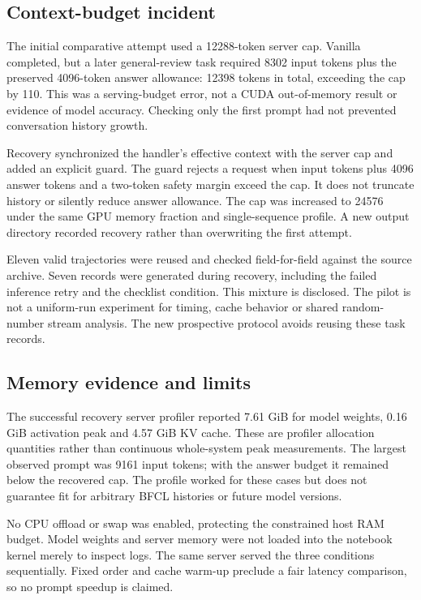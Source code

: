 \documentclass[conference]{IEEEtran}
\begin{document}
\subsection{Context-budget incident}
The initial comparative attempt used a 12288-token server cap. Vanilla completed, but a later general-review task required 8302 input tokens plus the preserved 4096-token answer allowance: 12398 tokens in total, exceeding the cap by 110. This was a serving-budget error, not a CUDA out-of-memory result or evidence of model accuracy. Checking only the first prompt had not prevented conversation history growth.

Recovery synchronized the handler's effective context with the server cap and added an explicit guard. The guard rejects a request when input tokens plus 4096 answer tokens and a two-token safety margin exceed the cap. It does not truncate history or silently reduce answer allowance. The cap was increased to 24576 under the same GPU memory fraction and single-sequence profile. A new output directory recorded recovery rather than overwriting the first attempt.

Eleven valid trajectories were reused and checked field-for-field against the source archive. Seven records were generated during recovery, including the failed inference retry and the checklist condition. This mixture is disclosed. The pilot is not a uniform-run experiment for timing, cache behavior or shared random-number stream analysis. The new prospective protocol avoids reusing these task records.

\subsection{Memory evidence and limits}
The successful recovery server profiler reported 7.61 GiB for model weights, 0.16 GiB activation peak and 4.57 GiB KV cache. These are profiler allocation quantities rather than continuous whole-system peak measurements. The largest observed prompt was 9161 input tokens; with the answer budget it remained below the recovered cap. The profile worked for these cases but does not guarantee fit for arbitrary BFCL histories or future model versions.

No CPU offload or swap was enabled, protecting the constrained host RAM budget. Model weights and server memory were not loaded into the notebook kernel merely to inspect logs. The same server served the three conditions sequentially. Fixed order and cache warm-up preclude a fair latency comparison, so no prompt speedup is claimed.
\end{document}
